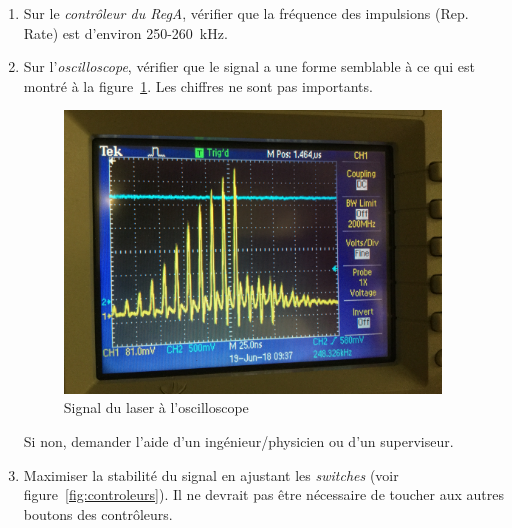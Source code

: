 \begin{enumerate}
\begin{itemize}
        \item[$\bullet$] L'alimentation d'azote se trouve sur le mur juste à côté de la porte d'entrée du laboratoire.
        \item[$\bullet$] Vérifier que le \textit{robinet gris} et le \textit{robinet vert} sont positionnés comme sur la figure~\ref{fig:azote}.
        \item[$\bullet$] Tourner le \textit{robinet noir}, "suffisamment pour entendre le jet quand on approche son oreille et qu'on prête attention, mais le son ne doit pas non plus être trop fort"\footnote{François Côté, 2018}.
        \item[$\bullet$] Une fois le pourcentage d'humidité rétabli, remettre le \textit{robinet noir} à sa position initiale.
        \item[$\bullet$] Si le pourcentage d'humidité demeure élevé, il se peut qu'il y ait une fuite dans le système. Demander l'aide d'un ingénieur/physicien ou d'un superviseur.
        \end{itemize}
    \item Sur le \textit{contrôleur du RegA}, vérifier que la fréquence des impulsions (Rep. Rate) est d'environ 250-260~kHz.
    \item Sur l'\textit{oscilloscope}, vérifier que le signal a une forme semblable à ce qui est montré à la figure~\ref{fig:oscilloscope}. Les chiffres ne sont pas importants.
        \begin{figure}[H]
        \centering
        \includegraphics[width=10cm]{oscilloscope.jpg}
        \caption{Signal du laser à l'oscilloscope}
        \label{fig:oscilloscope}
        \end{figure}
    Si non, demander l'aide d'un ingénieur/physicien ou d'un superviseur.
   \item Maximiser la stabilité du signal en ajustant les \textit{switches} (voir figure~\ref{fig:controleurs}). Il ne devrait pas être nécessaire de toucher aux autres boutons des contrôleurs.

\end{enumerate}
